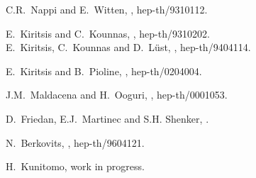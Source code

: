 \documentclass[a4paper,seceq,preprint]{ptptex}
\begin{document}
\begin{thebibliography}{99}
C.R.~Nappi and E.~Witten, , hep-th/9310112.

E.~Kiritsis and C.~Kounnas, , hep-th/9310202.\\
E.~Kiritsis, C.~Kounnas and D.~L\"ust, ,
hep-th/9404114.

E.~Kiritsis and B.~Pioline, , hep-th/0204004.

J.M.~Maldacena and H.~Ooguri, , hep-th/0001053.

D.~Friedan, E.J.~Martinec and S.H. Shenker, .

N.~Berkovits, , hep-th/9604121.

H.~Kunitomo, work in progress.

\end{thebibliography}
\end{document}
